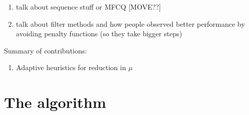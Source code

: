\documentclass{article}
\begin{document}
{\color{red}
\begin{enumerate}
\item talk about sequence stuff or MFCQ [MOVE??]
\item talk about filter methods and how people observed better performance by avoiding penalty functions (so they take bigger steps)
\end{enumerate}


Summary of contributions:

\begin{enumerate}
\item Adaptive heuristics for reduction in $\mu$
\end{enumerate}
}



\section{The algorithm}\label{sec:basic-alg}
\end{document}
